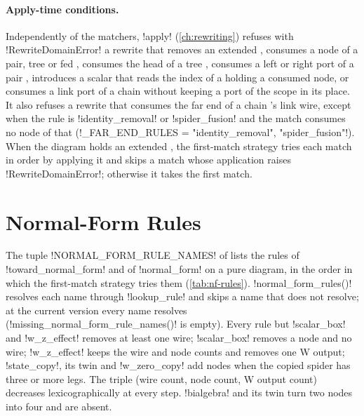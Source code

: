 \paragraph{Apply-time conditions.} Independently of the matchers, \py!apply! (\cref{ch:rewriting}) refuses with \py!RewriteDomainError! a rewrite that removes an extended \bbox{}, consumes a node of a pair, tree or fed \bbox{}, consumes the head of a tree \bbox{}, consumes a left or right port of a pair \bbox{}, introduces a scalar that reads the index of a \bbox{} holding a consumed node, or consumes a link port of a chain \bbox{} without keeping a port of the scope in its place. It also refuses a rewrite that consumes the far end of a chain \bbox{}'s link wire, except when the rule is \azx!identity_removal! or \azx!spider_fusion! and the match consumes no node of that \bbox{} (\py!_FAR_END_RULES = {"identity_removal", "spider_fusion"}!). When the diagram holds an extended \bbox{}, the first-match strategy tries each match in order by applying it and skips a match whose application raises \py!RewriteDomainError!; otherwise it takes the first match.

\section{Normal-Form Rules}\label{sec:app-rules-nf}

The tuple \py!NORMAL_FORM_RULE_NAMES! of  lists the rules of \py!toward_normal_form! and of \py!normal_form! on a pure diagram, in the order in which the first-match strategy tries them (\cref{tab:nf-rules}). \py!normal_form_rules()! resolves each name through \py!lookup_rule! and skips a name that does not resolve; at the current version every name resolves (\py!missing_normal_form_rule_names()! is empty). Every rule but \azx!scalar_box! and \azx!w_z_effect! removes at least one wire; \azx!scalar_box! removes a node and no wire; \azx!w_z_effect! keeps the wire and node counts and removes one W output; \azx!state_copy!, its twin and \azx!w_zero_copy! add nodes when the copied spider has three or more legs. The triple (wire count, node count, W output count) decreases lexicographically at every step. \azx!bialgebra! and its twin turn two nodes into four and are absent.

